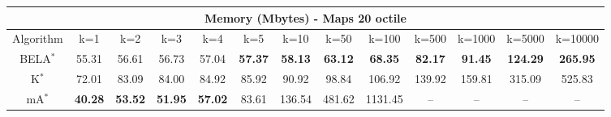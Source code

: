 \begin{tabular}{c|cccccccccccc}\toprule
\multicolumn{13}{c}{Memory (Mbytes) - Maps 20 octile}\\ \midrule
Algorithm & k=1 & k=2 & k=3 & k=4 & k=5 & k=10 & k=50 & k=100 & k=500 & k=1000 & k=5000 & k=10000 \\ \midrule
BELA$^*$ & 55.31 & 56.61 & 56.73 & 57.04 & \textbf{57.37} & \textbf{58.13} & \textbf{63.12} & \textbf{68.35} & \textbf{82.17} & \textbf{91.45} & \textbf{124.29} & \textbf{265.95} \\
K$^*$ & 72.01 & 83.09 & 84.00 & 84.92 & 85.92 & 90.92 & 98.84 & 106.92 & 139.92 & 159.81 & 315.09 & 525.83 \\
mA$^*$ & \textbf{40.28} & \textbf{53.52} & \textbf{51.95} & \textbf{57.02} & 83.61 & 136.54 & 481.62 & 1131.45 & -- & -- & -- & -- \\ \bottomrule 
\end{tabular}
